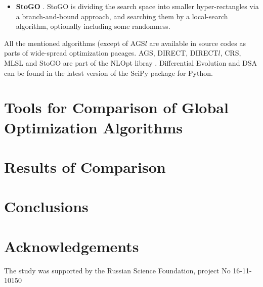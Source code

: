 \documentclass{svproc}
\begin{document}
\begin{itemize}
  \item \textbf{StoGO} \cite{Madsen1998}. StoGO is dividing the search space into smaller hyper-rectangles via a branch-and-bound approach,
  and searching them by a local-search algorithm, optionally including some randomness.

\end{itemize}

All the mentioned algorithms (except of AGS\(l\) are available in source codes as parts of wide-spread optimization pacages.
AGS, DIRECT, DIRECT$l$, CRS, MLSL and StoGO are part of the NLOpt libray \cite{nlopt}. Differential Evolution and DSA can be found in
the latest version of the SciPy \cite{scipy} package for Python.

\section{Tools for Comparison of Global Optimization Algorithms}

\section{Results of Comparison}

\section{Conclusions}

\section*{Acknowledgements}
The study was supported by the Russian Science Foundation, project No 16-11-
10150

%

{}
\end{document}

